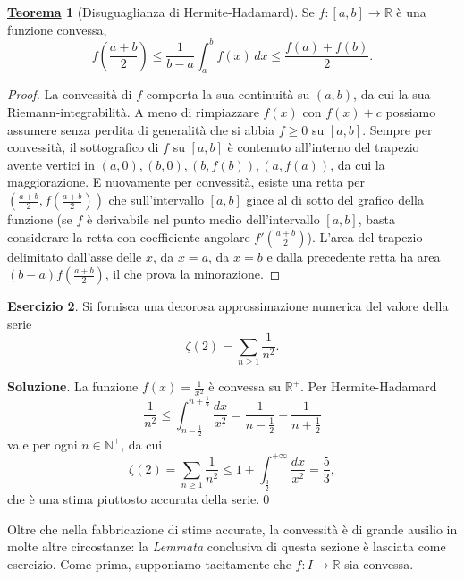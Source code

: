 \documentclass[a4paper,twoside]{article}
\newcommand{\R}{\mathbb{R}}
\theoremstyle{definition}
\newtheorem{theorem}{\color{Red}\underline{\textrm Teorema}}
\newtheorem{ex}[theorem]{Esercizio}
\numberwithin{theorem}{section}
\begin{document}
\begin{theorem}[Disuguaglianza di Hermite-Hadamard]
Se $f:[a,b]\to\mathbb{R}$ è una funzione convessa,
$$ f\left(\frac{a+b}{2}\right) \leq \frac{1}{b-a}\int_{a}^{b}f(x)\,dx \leq \frac{f(a)+f(b)}{2}.$$
\end{theorem}
\begin{proof} La convessità di $f$ comporta la sua continuità su $(a,b)$, da cui la sua Riemann-integrabilità. A meno di rimpiazzare $f(x)$ con $f(x)+c$ possiamo assumere senza perdita di generalità che si abbia $f\geq 0$ su $[a,b]$. Sempre per convessità, il sottografico di $f$ su $[a,b]$ è contenuto all'interno del trapezio avente vertici in $(a,0),(b,0),(b,f(b)),(a,f(a))$, da cui la maggiorazione.
E nuovamente per convessità, esiste una retta per $\left(\frac{a+b}{2},f\left(\frac{a+b}{2}\right)\right)$ che sull'intervallo $[a,b]$ giace al di sotto del grafico della funzione (se $f$ è derivabile nel punto medio dell'intervallo $[a,b]$, basta considerare la retta con coefficiente angolare $f'\left(\frac{a+b}{2}\right)$). L'area del trapezio delimitato dall'asse delle $x$, da $x=a$, da $x=b$ e dalla precedente retta ha area $(b-a)f\left(\frac{a+b}{2}\right)$, il che prova la minorazione.\end{proof}


\begin{ex} Si fornisca una decorosa approssimazione numerica del valore della serie $$\zeta(2)=\sum_{n\geq 1}\frac{1}{n^2}.$$
\end{ex}

\textbf{Soluzione}. La funzione $f(x)=\frac{1}{x^2}$ è convessa su $\mathbb{R}^+$. Per Hermite-Hadamard
$$ \frac{1}{n^2}\leq \int_{n-\frac{1}{2}}^{n+\frac{1}{2}}\frac{dx}{x^2}=\frac{1}{n-\frac{1}{2}}-\frac{1}{n+\frac{1}{2}} $$
vale per ogni $n\in\mathbb{N}^+$, da cui
$$\zeta(2)=\sum_{n\geq 1}\frac{1}{n^2}\leq 1+\int_{\frac{3}{2}}^{+\infty}\frac{dx}{x^2}=\frac{5}{3}, $$
che è una stima piuttosto accurata della serie.\qed



Oltre che nella fabbricazione di stime accurate, la convessità è di grande ausilio in molte altre circostanze: la \emph{Lemmata} conclusiva di questa sezione è lasciata come esercizio. Come prima, supponiamo tacitamente che $f:I\to\R$ sia convessa.\\
\end{document}
